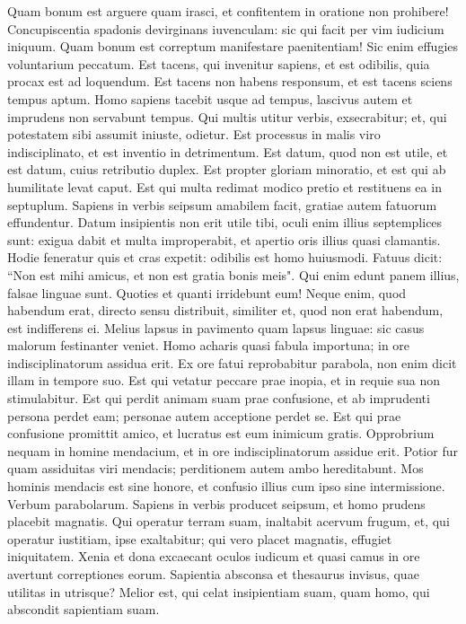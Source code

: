 \begin{biblechapter}  
\verse Quam bonum est arguere quam irasci, et confitentem in oratione non prohibere! 
\verse Concupiscentia spadonis devirginans iuvenculam: 
\verse sic qui facit per vim iudicium iniquum. 
\verse Quam bonum est correptum manifestare paenitentiam! Sic enim effugies voluntarium peccatum. 
\verse Est tacens, qui invenitur sapiens, et est odibilis, quia procax est ad loquendum. 
\verse Est tacens non habens responsum, et est tacens sciens tempus aptum. 
\verse Homo sapiens tacebit usque ad tempus, lascivus autem et imprudens non servabunt tempus. 
\verse Qui multis utitur verbis, exsecrabitur; et, qui potestatem sibi assumit iniuste, odietur. 
\verse Est processus in malis viro indisciplinato, et est inventio in detrimentum. 
\verse Est datum, quod non est utile, et est datum, cuius retributio duplex. 
\verse Est propter gloriam minoratio, et est qui ab humilitate levat caput. 
\verse Est qui multa redimat modico pretio et restituens ea in septuplum. 
\verse Sapiens in verbis seipsum amabilem facit, gratiae autem fatuorum effundentur. 
\verse Datum insipientis non erit utile tibi, oculi enim illius septemplices sunt: 
\verse exigua dabit et multa improperabit, et apertio oris illius quasi clamantis. 
\verse Hodie feneratur quis et cras expetit: odibilis est homo huiusmodi. 
\verse Fatuus dicit: “Non est mihi amicus, et non est gratia bonis meis". 
\verse Qui enim edunt panem illius, falsae linguae sunt. Quoties et quanti irridebunt eum! 
\verse Neque enim, quod habendum erat, directo sensu distribuit, similiter et, quod non erat habendum, est indifferens ei. 
\verse Melius lapsus in pavimento quam lapsus linguae: sic casus malorum festinanter veniet. 
\verse Homo acharis quasi fabula importuna; in ore indisciplinatorum assidua erit. 
\verse Ex ore fatui reprobabitur parabola, non enim dicit illam in tempore suo. 
\verse Est qui vetatur peccare prae inopia, et in requie sua non stimulabitur. 
\verse Est qui perdit animam suam prae confusione, et ab imprudenti persona perdet eam; personae autem acceptione perdet se. 
\verse Est qui prae confusione promittit amico, et lucratus est eum inimicum gratis. 
\verse Opprobrium nequam in homine mendacium, et in ore indisciplinatorum assidue erit. 
\verse Potior fur quam assiduitas viri mendacis; perditionem autem ambo hereditabunt. 
\verse Mos hominis mendacis est sine honore, et confusio illius cum ipso sine intermissione. 
\verse Verbum parabolarum. Sapiens in verbis producet seipsum, et homo prudens placebit magnatis. 
\verse Qui operatur terram suam, inaltabit acervum frugum, et, qui operatur iustitiam, ipse exaltabitur; qui vero placet magnatis, effugiet iniquitatem. 
\verse Xenia et dona excaecant oculos iudicum et quasi camus in ore avertunt correptiones eorum. 
\verse Sapientia absconsa et thesaurus invisus, quae utilitas in utrisque? 
\verse Melior est, qui celat insipientiam suam, quam homo, qui abscondit sapientiam suam. 
\end{biblechapter}


